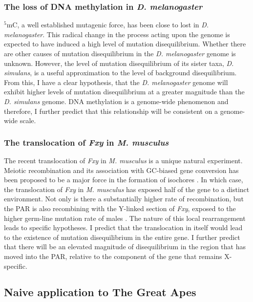 \subsubsection{The loss of DNA methylation in \textit{D. melanogaster}}

$^5$mC, a well established mutagenic force, has been close to lost in \textit{D. melanogaster}. This radical change in the process acting upon the genome is expected to have induced a high level of mutation disequilibrium. Whether there are other causes of mutation disequilibrium in the \textit{D. melanogaster} genome is unknown. However, the level of mutation disequilibrium of its sister taxa, \textit{D. simulans}, is a useful approximation to the level of background disequilibrium. From this, I have a clear hypothesis, that the \textit{D. melanogaster} genome will exhibit higher levels of mutation disequilibrium at a greater magnitude than the \textit{D. simulans} genome. DNA methylation is a genome-wide phenomenon and therefore, I further predict that this relationship will be consistent on a genome-wide scale. 
 
\subsubsection{The translocation of \textit{Fxy} in \textit{M. musculus}}

The recent translocation of \textit{Fxy} in \textit{M. musculus} is a unique natural experiment. Meiotic recombination and its association with GC-biased gene conversion has been proposed to be a major force in the formation of isochores \citep{Montoya-Burgos2003RecombinationGenomes}. In which case, the translocation of \textit{Fxy} in \textit{M. musculus} has exposed half of the gene to a distinct environment. Not only is there a substantially higher rate of recombination, but the PAR is also recombining with the Y-linked section of \textit{Fxy}, exposed to the higher germ-line mutation rate of males \citep{Huttley2000HowMutagenesis}. The nature of this local rearrangement leads to specific hypotheses. I predict that the translocation in itself would lead to the existence of mutation disequilibrium in the entire gene. I further predict that there will be an elevated magnitude of disequilibrium in the region that has moved into the PAR, relative to the component of the gene that remains X-specific. 

\subsection{Naive application to The Great Apes}

